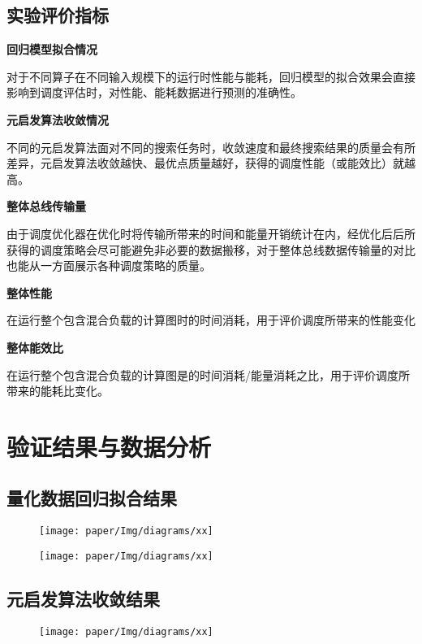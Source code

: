     \subsection{实验评价指标}\label{sec:evaluation_metrics}
    \textbf{回归模型拟合情况}
    
    对于不同算子在不同输入规模下的运行时性能与能耗，回归模型的拟合效果会直接影响到调度评估时，对性能、能耗数据进行预测的准确性。
    
    \textbf{元启发算法收敛情况}

    不同的元启发算法面对不同的搜索任务时，收敛速度和最终搜索结果的质量会有所差异，元启发算法收敛越快、最优点质量越好，获得的调度性能（或能效比）就越高。
    
    \textbf{整体总线传输量}

    由于调度优化器在优化时将传输所带来的时间和能量开销统计在内，经优化后后所获得的调度策略会尽可能避免非必要的数据搬移，对于整体总线数据传输量的对比也能从一方面展示各种调度策略的质量。
    
    \textbf{整体性能}

    在运行整个包含混合负载的计算图时的时间消耗，用于评价调度所带来的性能变化

    
    \textbf{整体能效比}

    在运行整个包含混合负载的计算图是的时间消耗/能量消耗之比，用于评价调度所带来的能耗比变化。

\section{验证结果与数据分析}\label{sec:experiment_result}
    \subsection{量化数据回归拟合结果}\label{subsec:quantified_regression_training}
    \begin{figure}[!htbp]
        \centering
        \texttt{[image: paper/Img/diagrams/xx]}
        \bicaption{\quad }
        {\quad }
        \label{fig:xx}
    \end{figure}
    \begin{figure}[!htbp]
        \centering
        \texttt{[image: paper/Img/diagrams/xx]}
        \bicaption{\quad }
        {\quad }
        \label{fig:xx}
    \end{figure}
    \subsection{元启发算法收敛结果}\label{subsec:metaheuristic_convergence}
    \begin{figure}[!htbp]
        \centering
        \texttt{[image: paper/Img/diagrams/xx]}
        \bicaption{\quad }
        {\quad }
        \label{fig:xx}
    \end{figure}
